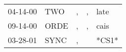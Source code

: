 \begin{supertabular}{lllll}
 04-14-00 &   TWO &  , &  , &   late \\
 09-14-00 &  ORDE &  , &  , &   cais \\
 03-28-01 &  SYNC &  , &    &  *CS1* \\
\end{supertabular}
